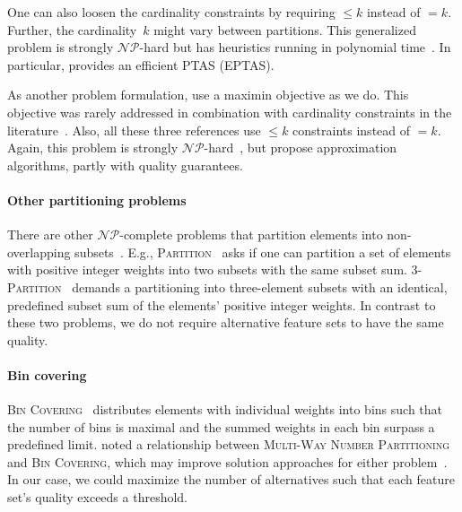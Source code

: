 \documentclass{article}
\theoremstyle{definition}
\begin{document}
One can also loosen the cardinality constraints by requiring $\leq k$ instead of $= k$.
Further, the cardinality~$k$ might vary between partitions.
This generalized problem is strongly $\mathcal{NP}$-hard but has heuristics running in polynomial time~\cite{kellerer2011a32approximation}.
In particular, \cite{chen2016efficient} provides an efficient PTAS (EPTAS).

As another problem formulation, \cite{chen20023partitioning, he2003kappa, lawrinenko2018reduction} use a maximin objective as we do.
This objective was rarely addressed in combination with cardinality constraints in the literature~\cite{lawrinenko2018reduction}.
Also, all these three references use $\leq k$ constraints instead of $= k$.
Again, this problem is strongly $\mathcal{NP}$-hard~\cite{he2003kappa}, but \cite{chen20023partitioning, he2003kappa, lawrinenko2018reduction} propose approximation algorithms, partly with quality guarantees.

\paragraph{Other partitioning problems}

There are other $\mathcal{NP}$-complete problems that partition elements into non-overlapping subsets~\cite{garey2003computers}.
E.g., \textsc{Partition}~\cite{karp1972reducibility} asks if one can partition a set of elements with positive integer weights into two subsets with the same subset sum.
\textsc{3-Partition}~\cite{garey2003computers} demands a partitioning into three-element subsets with an identical, predefined subset sum of the elements' positive integer weights.
In contrast to these two problems, we do not require alternative feature sets to have the same quality.

\paragraph{Bin covering}

\textsc{Bin Covering}~\cite{assmann1984dual} distributes elements with individual weights into bins such that the number of bins is maximal and the summed weights in each bin surpass a predefined limit.
\cite{lawrinenko2017identical} noted a relationship between \textsc{Multi-Way Number Partitioning} and \textsc{Bin Covering}, which may improve solution approaches for either problem~\cite{walter2017lower, walter2017improved}.
In our case, we could maximize the number of alternatives such that each feature set's quality exceeds a threshold.
\end{document}
